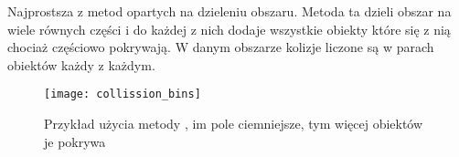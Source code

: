 \smallskip

Najprostsza z metod opartych na dzieleniu obszaru. Metoda ta dzieli obszar na wiele równych czę\'sci i do każdej z nich dodaje wszystkie obiekty które się z nią chociaż czę\'sciowo pokrywają. W danym obszarze kolizje liczone są w parach obiektów każdy z każdym.\\
\begin{figure}[h]
	\centering
	\noindent\texttt{[image: collission\_bins]}
	\caption{Przykład użycia metody , im pole ciemniejsze, tym więcej obiektów je pokrywa}
\end{figure}\\
\newpage